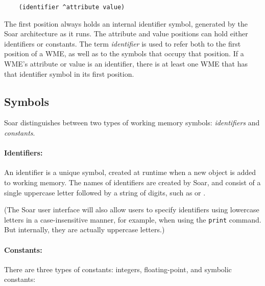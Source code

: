\begin{verbatim}
	(identifier ^attribute value)
\end{verbatim}

The first position always holds an internal identifier symbol, generated by the Soar architecture as it runs. The attribute and value positions can hold either identifiers or constants. The term \emph{identifier} is used to refer both to the first position of a WME, as well as to the symbols that occupy that position. If a WME's attribute or value is an identifier, there is at least one WME that has that identifier symbol in its first position. 


\subsection{Symbols}
\label{SYNTAX-wm-symbols}

Soar distinguishes between two types of working memory symbols: \emph{identifiers} and {\em constants}. 

\paragraph{Identifiers:}

An identifier is a unique symbol, created at runtime when a new object is added to working memory. The names of identifiers are
created by Soar, and consist of a single uppercase letter followed by a string of digits, such as  or .

(The Soar user interface will also allow users to specify identifiers using lowercase letters in a case-insensitive manner, for example, when using the \texttt{print} command. But internally, they are actually uppercase letters.)

\paragraph{Constants:} 

There are three types of constants: integers, floating-point, and symbolic constants:


